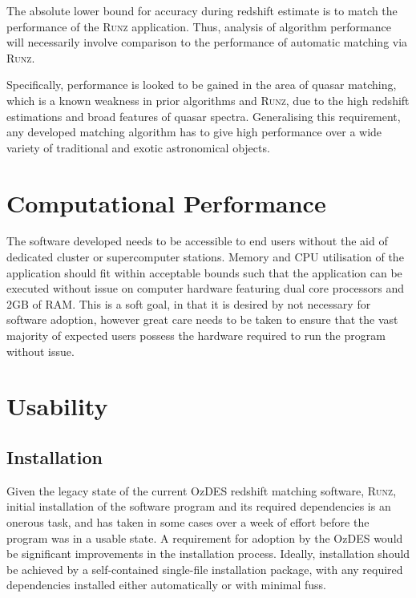 \documentclass[titlesmallcaps, examinerscopy, copyrightpage]{uqthesis}
\begin{document}
The absolute lower bound for accuracy during redshift estimate is to match the performance of the \textsc{Runz} application. Thus, analysis of algorithm performance will necessarily involve comparison to the performance of automatic matching via \textsc{Runz}.

Specifically, performance is looked to be gained in the area of quasar matching, which is a known weakness in prior algorithms and \textsc{Runz}, due to the high redshift estimations and broad features of quasar spectra. Generalising this requirement, any developed matching algorithm has to give high performance over a wide variety of traditional and exotic astronomical objects.

\section{Computational Performance}

The software developed needs to be accessible to end users without the aid of dedicated cluster or supercomputer stations. Memory and CPU utilisation of the application should fit within acceptable bounds such that the application can be executed without issue on computer hardware featuring dual core processors and 2GB of RAM. This is a soft goal, in that it is desired by not necessary for software adoption, however great care needs to be taken to ensure that the vast majority of expected users possess the hardware required to run the program without issue.

\section{Usability}

\subsection{Installation}

Given the legacy state of the current OzDES redshift matching software, \textsc{Runz}, initial installation of the software program and its required dependencies is an onerous task, and has taken in some cases over a week of effort before the program was in a usable state. A requirement for adoption by the OzDES would be significant improvements in the installation process. Ideally, installation should be achieved by a self-contained  single-file installation package, with any required dependencies installed either automatically or with minimal fuss.
\end{document}
